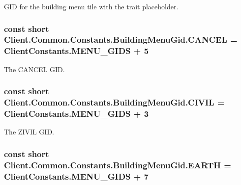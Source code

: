 G\+I\+D for the building menu tile with the trait placeholder. 

\hypertarget{classClient_1_1Common_1_1Constants_1_1BuildingMenuGid_a579cfcb906bd63b371b97d8dab21bcb3}{}
\subsubsection[{C\+A\+N\+C\+E\+L}]{\setlength{\rightskip}{0pt plus 5cm}const short Client.\+Common.\+Constants.\+Building\+Menu\+Gid.\+C\+A\+N\+C\+E\+L = {\bf Client\+Constants.\+M\+E\+N\+U\+\_\+\+G\+I\+D\+S} + 5}\label{classClient_1_1Common_1_1Constants_1_1BuildingMenuGid_a579cfcb906bd63b371b97d8dab21bcb3}


The C\+A\+N\+C\+E\+L G\+I\+D. 

\hypertarget{classClient_1_1Common_1_1Constants_1_1BuildingMenuGid_aa0f7e4045ddcdcde1b66a8aacdc44afe}{}
\subsubsection[{C\+I\+V\+I\+L}]{\setlength{\rightskip}{0pt plus 5cm}const short Client.\+Common.\+Constants.\+Building\+Menu\+Gid.\+C\+I\+V\+I\+L = {\bf Client\+Constants.\+M\+E\+N\+U\+\_\+\+G\+I\+D\+S} + 3}\label{classClient_1_1Common_1_1Constants_1_1BuildingMenuGid_aa0f7e4045ddcdcde1b66a8aacdc44afe}


The Z\+I\+V\+I\+L G\+I\+D. 

\hypertarget{classClient_1_1Common_1_1Constants_1_1BuildingMenuGid_a8d1308488d4c82b22076bb64b16fbfdd}{}
\subsubsection[{E\+A\+R\+T\+H}]{\setlength{\rightskip}{0pt plus 5cm}const short Client.\+Common.\+Constants.\+Building\+Menu\+Gid.\+E\+A\+R\+T\+H = {\bf Client\+Constants.\+M\+E\+N\+U\+\_\+\+G\+I\+D\+S} + 7}\label{classClient_1_1Common_1_1Constants_1_1BuildingMenuGid_a8d1308488d4c82b22076bb64b16fbfdd}


